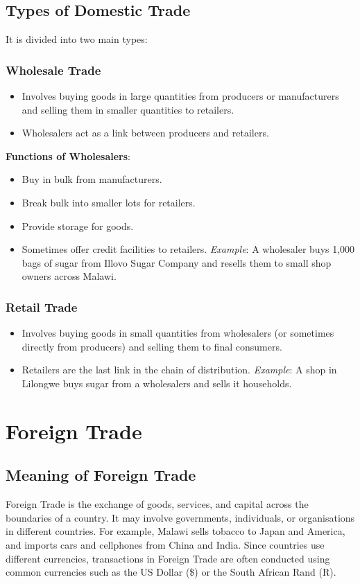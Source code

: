 \documentclass[12pt,a4paper, openany]{book}
\begin{document}
\subsection{Types of Domestic Trade}
It is divided into two main types:
\subsubsection{Wholesale Trade}
\begin{itemize}
	\item Involves buying goods in large quantities from producers or manufacturers and selling them in smaller
	      quantities to retailers.
	\item Wholesalers act as a link between producers and retailers.
\end{itemize}
\textbf{Functions of Wholesalers}:
\begin{itemize}
	\item Buy in bulk from manufacturers.
	\item Break bulk into smaller lots for retailers.
	\item Provide storage for goods.
	\item Sometimes offer credit facilities to retailers.
	      \textit{Example}: A wholesaler buys 1,000 bags of sugar from Illovo Sugar Company and resells them
	      to small shop owners across Malawi.
\end{itemize}
\subsubsection{Retail Trade}
\begin{itemize}
	\item Involves buying goods in small quantities from wholesalers (or sometimes directly from producers)
	      and selling them to final consumers.
	\item Retailers are the last link in the chain of distribution.
	      \textit{Example}: A shop in Lilongwe buys sugar from a wholesalers and sells it households.
\end{itemize}
\section{Foreign Trade}

\subsection{Meaning of Foreign Trade}
Foreign Trade is the exchange of goods, services, and capital across the boundaries of a country.
It may involve governments, individuals, or organisations in different countries.
For example, Malawi sells tobacco to Japan and America, and imports cars and cellphones from China and India.
Since countries use different currencies, transactions in Foreign Trade are often conducted using common currencies such as the US Dollar (\$) or the South African Rand (R).
\end{document}
